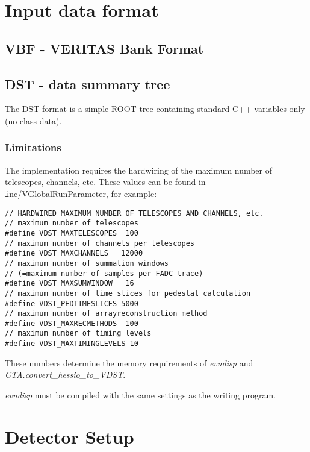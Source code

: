 \documentclass[titlepage,a4paper,twoside,11pt]{report}
\begin{document}
\chapter{Input data format}

\section{VBF - VERITAS Bank Format}

\section{DST - data summary tree}

The DST format is a simple ROOT tree containing standard C++ variables only (no class data).

\subsection{Limitations}

The implementation requires the hardwiring of the maximum number of telescopes, channels, etc. 
These values can be found in {\texttt inc/VGlobalRunParameter}, for example:

\begin{lstlisting}
// HARDWIRED MAXIMUM NUMBER OF TELESCOPES AND CHANNELS, etc.
// maximum number of telescopes
#define VDST_MAXTELESCOPES  100
// maximum number of channels per telescopes
#define VDST_MAXCHANNELS   12000
// maximum number of summation windows
// (=maximum number of samples per FADC trace)   
#define VDST_MAXSUMWINDOW   16
// maximum number of time slices for pedestal calculation
#define VDST_PEDTIMESLICES 5000   
// maximum number of arrayreconstruction method 
#define VDST_MAXRECMETHODS  100
// maximum number of timing levels
#define VDST_MAXTIMINGLEVELS 10    
\end{lstlisting}

 These numbers determine the memory requirements of {\it evndisp} and {\it CTA.convert\_hessio\_to\_VDST}.

 {\it evndisp} must be compiled with the same settings as the writing program.


\chapter{Detector Setup}
\end{document}
